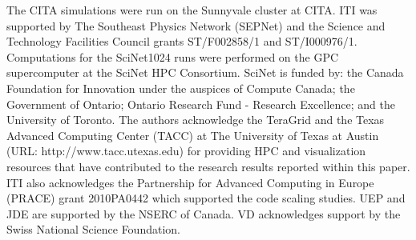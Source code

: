\documentclass[useAMS,usenatbib]{mn2e}
\begin{document}
The CITA simulations were run on the Sunnyvale cluster at CITA.
ITI was supported by The Southeast Physics
Network (SEPNet) and the Science and Technology Facilities Council
grants ST/F002858/1 and ST/I000976/1. 
Computations for the SciNet1024 runs were performed on the GPC supercomputer at the SciNet HPC Consortium. SciNet is funded by: the Canada Foundation for Innovation under the auspices of Compute Canada; the Government of Ontario; Ontario Research Fund - Research Excellence; and the University of Toronto. 
The authors acknowledge the
TeraGrid and the Texas Advanced Computing Center (TACC) at The
University of Texas at Austin (URL: http://www.tacc.utexas.edu) for
providing HPC and visualization resources that have contributed to the
research results reported within this paper. ITI also acknowledges the Partnership for Advanced
Computing in Europe (PRACE) grant 2010PA0442 which supported the code
scaling studies. UEP and JDE are supported by the NSERC of Canada.
VD acknowledges support by the Swiss National Science Foundation.






{}
%

\bsp

\label{lastpage}
\end{document}
